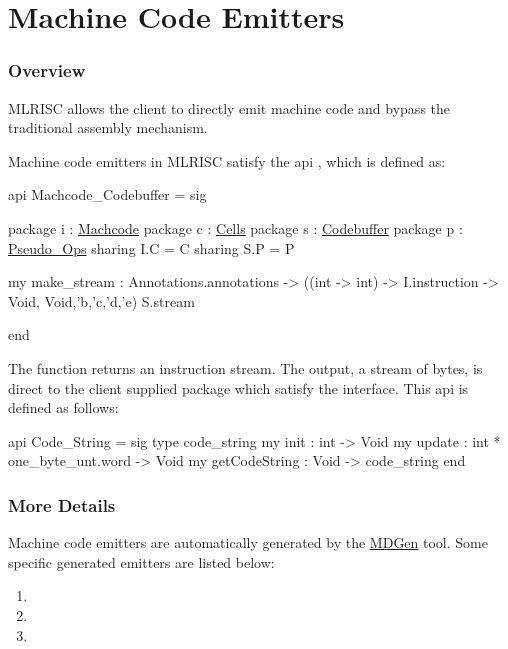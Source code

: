 \section{Machine Code Emitters}

\subsubsection{Overview}
MLRISC allows the client to directly emit machine code and bypass the traditional
assembly mechanism. 

Machine code emitters in MLRISC satisfy the api 
,
which is defined as:
\begin{SML}
api Machcode_Codebuffer =
sig

   package i : \href{instructions.html}{Machcode}
   package c : \href{cells.html}{Cells}
   package s : \href{streams.html}{Codebuffer}
   package p : \href{pseudo-ops.html}{Pseudo_Ops}
      sharing I.C = C  
      sharing S.P = P

   my make_stream : Annotations.annotations ->
                     ((int -> int) -> I.instruction -> Void,
                      Void,'b,'c,'d,'e) S.stream

end
\end{SML}

The function  returns an instruction stream.
The output, a stream of bytes, is direct to the client supplied
package which satisfy the 
 interface.
This api is defined as follows:
\begin{SML}
api Code_String = sig
  type code_string
  my init          : int -> Void
  my update        : int * one_byte_unt.word -> Void
  my getCodeString : Void -> code_string
end
\end{SML}

\subsubsection{More Details}

Machine code emitters are automatically generated by the 
\href{mlrisc-md.html}{MDGen} tool.  Some specific generated
emitters are listed below:
\begin{enumerate}
 \item {}
 \item {}
 \item {}
\end{enumerate}
